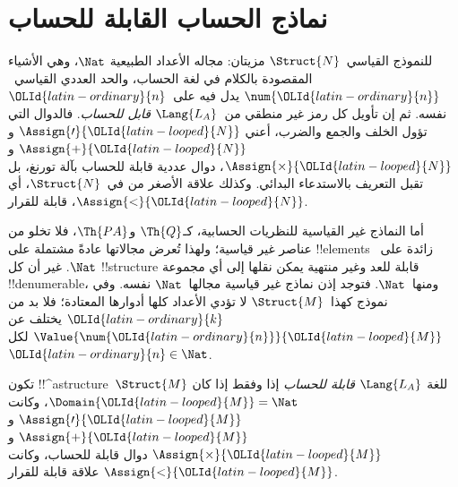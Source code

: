 \documentclass[../../../include/open-logic-section]{subfiles}
\begin{document}
\section{نماذج الحساب القابلة للحساب}

\begin{explain}
للنموذج القياسي~$\Struct{N}$ مزيتان: مجاله الأعداد الطبيعية
$\Nat$، وهي الأشياء المقصودة بالكلام في لغة الحساب، والحد
العددي القياسي~$\num{{\OLId{latin-ordinary}{n}}}$ يدل فيه على~${\OLId{latin-ordinary}{n}}$ نفسه. ثم إن تأويل
كل رمز غير منطقي من~$\Lang{L_A}$ \emph{قابل للحساب}.
فالدوال التي تؤول الخلف والجمع والضرب، أعني
$\Assign{\prime}{{\OLId{latin-looped}{N}}}$ و$\Assign{+}{{\OLId{latin-looped}{N}}}$ و$\Assign{\times}{{\OLId{latin-looped}{N}}}$،
دوال عددية قابلة للحساب بآلة تورنغ، بل تقبل التعريف
بالاستدعاء البدائي. وكذلك علاقة الأصغر من في~$\Struct{N}$،
أي $\Assign{<}{{\OLId{latin-looped}{N}}}$، قابلة للقرار.

أما النماذج غير القياسية للنظريات الحسابية، كـ$\Th{Q}$
و$\Th{PA}$، فلا تخلو من عناصر غير قياسية؛ ولهذا تُعرض
مجالاتها عادةً مشتملة على !!{element}s زائدة على~$\Nat$.
غير أن كل !!{structure} قابلة للعد وغير منتهية يمكن نقلها
إلى أي مجموعة !!{denumerable}، ومنها~$\Nat$.
فتوجد إذن نماذج غير قياسية مجالها~$\Nat$ نفسه.
وفي نموذج كهذا~$\Struct{M}$ لا تؤدي الأعداد كلها أدوارها
المعتادة؛ فلا بد من ${\OLId{latin-ordinary}{k}}$ يختلف عن $\Value{\num{{\OLId{latin-ordinary}{n}}}}{{\OLId{latin-looped}{M}}}$
لكل~${\OLId{latin-ordinary}{n}} \in \Nat$.
\end{explain}

\begin{defn}
تكون !!^a{structure}~$\Struct{M}$ للغة $\Lang{L_A}$ \emph{قابلة
للحساب} إذا وفقط إذا كان $\Domain{{\OLId{latin-looped}{M}}}=\Nat$، وكانت
$\Assign{\prime}{{\OLId{latin-looped}{M}}}$ و$\Assign{+}{{\OLId{latin-looped}{M}}}$ و$\Assign{\times}{{\OLId{latin-looped}{M}}}$ دوال قابلة
للحساب، وكانت $\Assign{<}{{\OLId{latin-looped}{M}}}$ علاقة قابلة للقرار.
\end{defn}
\end{document}
